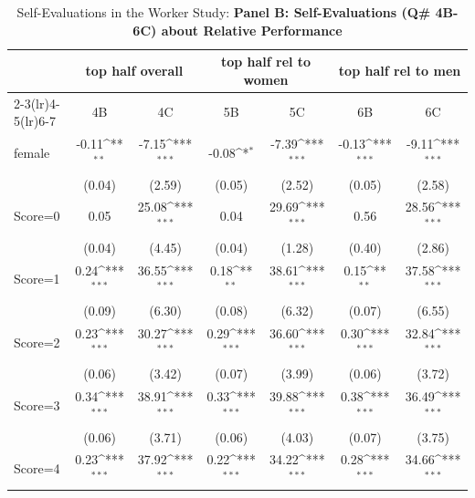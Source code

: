 \begin{table}[htbp]\centering
\def\sym#1{\ifmmode^{#1}\else\(^{#1}\)\fi}
\caption{Self-Evaluations in the Worker Study: \textbf{Panel B: Self-Evaluations (Q\# 4B-6C) about Relative Performance}}
\begin{tabular}{l*{6}{c}}
\hline\hline
                &\multicolumn{2}{c}{top half overall} &\multicolumn{2}{c}{top half rel to women}&\multicolumn{2}{c}{top half rel to men}\\\cmidrule(lr){2-3}\cmidrule(lr){4-5}\cmidrule(lr){6-7}
                &\multicolumn{1}{c}{4B}&\multicolumn{1}{c}{4C}&\multicolumn{1}{c}{5B}&\multicolumn{1}{c}{5C}&\multicolumn{1}{c}{6B}&\multicolumn{1}{c}{6C}\\
\hline
female          &    -0.11\sym{**} &    -7.15\sym{***}&    -0.08\sym{*}  &    -7.39\sym{***}&    -0.13\sym{***}&    -9.11\sym{***}\\
                &   (0.04)         &   (2.59)         &   (0.05)         &   (2.52)         &   (0.05)         &   (2.58)         \\
Score=0         &     0.05         &    25.08\sym{***}&     0.04         &    29.69\sym{***}&     0.56         &    28.56\sym{***}\\
                &   (0.04)         &   (4.45)         &   (0.04)         &   (1.28)         &   (0.40)         &   (2.86)         \\
Score=1         &     0.24\sym{***}&    36.55\sym{***}&     0.18\sym{**} &    38.61\sym{***}&     0.15\sym{**} &    37.58\sym{***}\\
                &   (0.09)         &   (6.30)         &   (0.08)         &   (6.32)         &   (0.07)         &   (6.55)         \\
Score=2         &     0.23\sym{***}&    30.27\sym{***}&     0.29\sym{***}&    36.60\sym{***}&     0.30\sym{***}&    32.84\sym{***}\\
                &   (0.06)         &   (3.42)         &   (0.07)         &   (3.99)         &   (0.06)         &   (3.72)         \\
Score=3         &     0.34\sym{***}&    38.91\sym{***}&     0.33\sym{***}&    39.88\sym{***}&     0.38\sym{***}&    36.49\sym{***}\\
                &   (0.06)         &   (3.71)         &   (0.06)         &   (4.03)         &   (0.07)         &   (3.75)         \\
Score=4         &     0.23\sym{***}&    37.92\sym{***}&     0.22\sym{***}&    34.22\sym{***}&     0.28\sym{***}&    34.66\sym{***}\\

\end{tabular}
\end{table}
